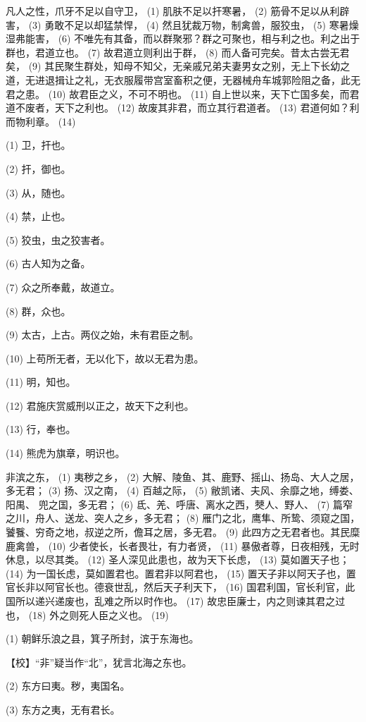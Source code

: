 \documentclass[12pt,UTF8]{ctexbook}
\begin{document}
凡人之性，爪牙不足以自守卫， (1) 肌肤不足以扞寒暑， (2) 筋骨不足以从利辟害， (3) 勇敢不足以却猛禁悍， (4) 然且犹裁万物，制禽兽，服狡虫， (5) 寒暑燥湿弗能害， (6) 不唯先有其备，而以群聚邪？群之可聚也，相与利之也。利之出于群也，君道立也。 (7) 故君道立则利出于群， (8) 而人备可完矣。昔太古尝无君矣， (9) 其民聚生群处，知母不知父，无亲戚兄弟夫妻男女之别，无上下长幼之道，无进退揖让之礼，无衣服履带宫室畜积之便，无器械舟车城郭险阻之备，此无君之患。 (10) 故君臣之义，不可不明也。 (11) 自上世以来，天下亡国多矣，而君道不废者，天下之利也。 (12) 故废其非君，而立其行君道者。 (13) 君道何如？利而物利章。 (14)

(1) 卫，扞也。

(2) 扞，御也。

(3) 从，随也。

(4) 禁，止也。

(5) 狡虫，虫之狡害者。

(6) 古人知为之备。

(7) 众之所奉戴，故道立。

(8) 群，众也。

(9) 太古，上古。两仪之始，未有君臣之制。

(10) 上苟所无者，无以化下，故以无君为患。

(11) 明，知也。

(12) 君施庆赏威刑以正之，故天下之利也。

(13) 行，奉也。

(14) 熊虎为旗章，明识也。

非滨之东， (1) 夷秽之乡， (2) 大解、陵鱼、其、鹿野、摇山、扬岛、大人之居，多无君； (3) 扬、汉之南， (4) 百越之际， (5) 敝凯诸、夫风、余靡之地，缚娄、阳禺、 兜之国，多无君； (6) 氐、羌、呼唐、离水之西，僰人、野人、 (7) 篇窄之川，舟人、送龙、突人之乡，多无君； (8) 雁门之北，鹰隼、所鸷、须窥之国，饕餮、穷奇之地，叔逆之所，儋耳之居，多无君。 (9) 此四方之无君者也。其民糜鹿禽兽， (10) 少者使长，长者畏壮，有力者贤， (11) 暴傲者尊，日夜相残，无时休息，以尽其类。 (12) 圣人深见此患也，故为天下长虑， (13) 莫如置天子也； (14) 为一国长虑，莫如置君也。置君非以阿君也， (15) 置天子非以阿天子也，置官长非以阿官长也。德衰世乱，然后天子利天下， (16) 国君利国，官长利官，此国所以递兴递废也，乱难之所以时作也。 (17) 故忠臣廉士，内之则谏其君之过也， (18) 外之则死人臣之义也。 (19)

(1) 朝鲜乐浪之县，箕子所封，滨于东海也。

【校】“非”疑当作“北”，犹言北海之东也。

(2) 东方曰夷。秽，夷国名。

(3) 东方之夷，无有君长。
\end{document}
